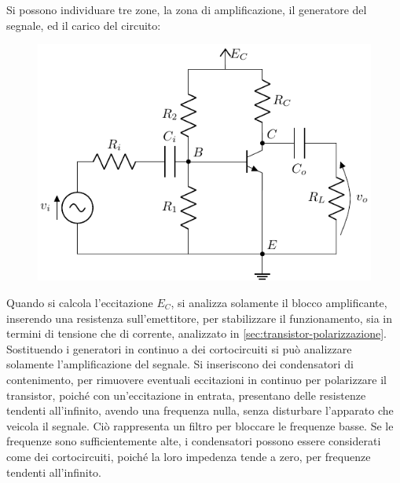 \documentclass{article}
\numberwithin{equation}{subsection}
\begin{document}
Si possono individuare tre zone, la zona di amplificazione, il generatore del segnale, ed il carico del circuito:
\begin{figure}[H]%
    \centering
    \includegraphics{bjt-piccoli-segnali.pdf}%
    \label{fig:bjt-piccoli-segnali}
\end{figure}
Quando si calcola l'eccitazione $E_C$, si analizza solamente il blocco amplificante, inserendo una resistenza sull'emettitore, per stabilizzare il funzionamento, sia in 
termini di tensione che di corrente, analizzato in \ref{sec:transistor-polarizzazione}.
Sostituendo i generatori in continuo a dei cortocircuiti si può analizzare solamente l'amplificazione del segnale. 
Si inseriscono dei condensatori di contenimento, per rimuovere eventuali eccitazioni in continuo per polarizzare il transistor, poiché con un'eccitazione in 
entrata, presentano delle resistenze tendenti all'infinito, avendo una frequenza nulla, senza disturbare l'apparato che veicola il segnale. Ciò rappresenta un filtro 
per bloccare le frequenze basse. Se le frequenze sono sufficientemente alte, i condensatori possono essere considerati come dei cortocircuiti, poiché 
la loro impedenza tende a zero, per frequenze tendenti all'infinito. 
\end{document}
